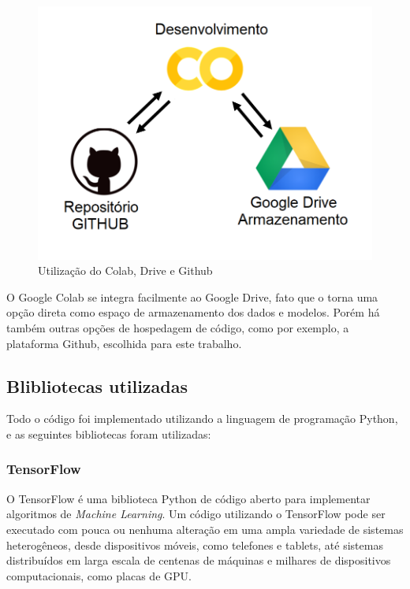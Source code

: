 \begin{figure}[H]
		\centering
		\includegraphics[scale=0.25]{figuras/MachineLearning/colabGithub.png}
		\caption{Utilização do Colab, Drive e Github}
		\label{fig:colabGithub}
\end{figure}

O Google Colab se integra facilmente ao Google Drive, fato que o torna uma opção direta como espaço de armazenamento dos dados e modelos. Porém há também outras opções de hospedagem de código, como por exemplo, a plataforma Github, escolhida para este trabalho.

\subsection{Blibliotecas utilizadas}

Todo o código foi implementado utilizando a linguagem de programação Python, e as seguintes bibliotecas foram utilizadas:


\subsubsection{TensorFlow}

O TensorFlow é uma biblioteca Python de código aberto para implementar algoritmos de \textit{Machine Learning}. Um código utilizando o TensorFlow pode ser executado com pouca ou nenhuma alteração em uma ampla variedade de sistemas heterogêneos, desde dispositivos móveis, como telefones e tablets, até sistemas distribuídos em larga escala de centenas de máquinas e milhares de dispositivos computacionais, como placas de GPU.

